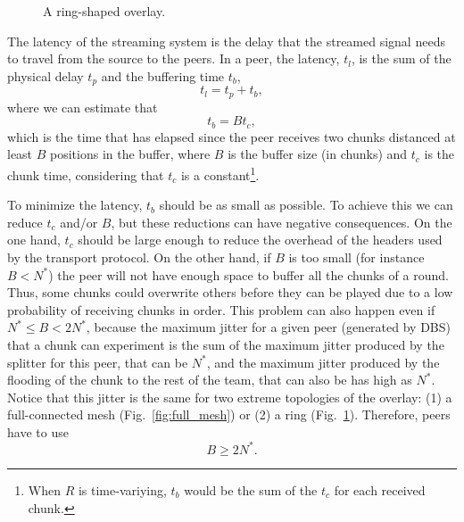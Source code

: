 

\label{sec:latency}

\begin{figure}
  \centering
  \vbox{}
  \caption{A ring-shaped overlay.}
  \label{fig:ring}
\end{figure}

The latency of the streaming system is the delay that the streamed
signal needs to travel from the source to the peers. In a peer, the
latency, $t_l$, is the sum of the physical delay $t_p$ and the
buffering time $t_b$,
\begin{equation}
  \label{eq:t_l}
  t_l = t_p + t_b,
\end{equation}
where we can estimate that
\begin{equation}
  \label{eq:t_b}
  t_b = Bt_c,
\end{equation}
which is the time that has elapsed since the peer receives two chunks
distanced at least $B$ positions in the buffer, where $B$ is the
buffer size (in chunks) and $t_c$ is the chunk time, considering that
$t_c$ is a constant\footnote{When $R$ is time-variying, $t_b$ would be
  the sum of the $t_c$ for each received chunk.}.

To minimize the latency, $t_b$ should be as small as possible. To
achieve this we can reduce $t_c$ and/or $B$, but these reductions can
have negative consequences. On the one hand, $t_c$ should be large
enough to reduce the overhead of the headers used by the transport
protocol. On the other hand, if $B$ is too small (for instance
$B<N^*$) the peer will not have enough space to buffer all the chunks
of a round. Thus, some chunks could overwrite others before they can
be played due to a low probability of receiving chunks in order. This
problem can also happen even if $N^*\leq B<2N^*$, because the maximum
jitter for a given peer (generated by DBS) that a chunk can experiment
is the sum of the maximum jitter produced by the splitter for this
peer, that can be $N^*$, and the maximum jitter produced by the
flooding of the chunk to the rest of the team, that can also be has
high as $N^*$. Notice that this jitter is the same for two extreme
topologies of the overlay: (1) a full-connected mesh
(Fig.~\ref{fig:full_mesh}) or (2) a ring
(Fig.~\ref{fig:ring}). Therefore, peers have to use
\begin{equation}
  \label{eq:minimum_B}
  B\ge 2N^*.
\end{equation}

